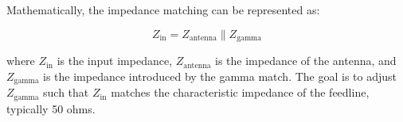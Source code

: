 Mathematically, the impedance matching can be represented as:

\[
Z_{\text{in}} = Z_{\text{antenna}} \parallel Z_{\text{gamma}}
\]

where \(Z_{\text{in}}\) is the input impedance, \(Z_{\text{antenna}}\) is the impedance of the antenna, and \(Z_{\text{gamma}}\) is the impedance introduced by the gamma match. The goal is to adjust \(Z_{\text{gamma}}\) such that \(Z_{\text{in}}\) matches the characteristic impedance of the feedline, typically 50 ohms.

